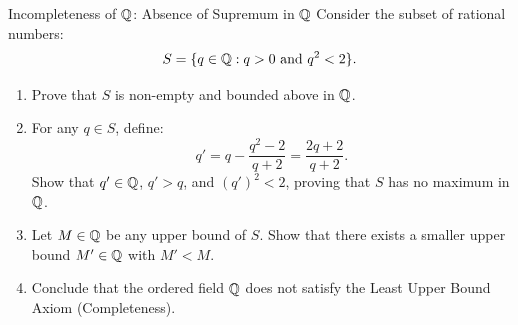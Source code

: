 \begin{exercise}{Incompleteness of $\mathbb{Q}$: Absence of Supremum in $\mathbb{Q}$}
Consider the subset of rational numbers:
\[
S = \{q \in \mathbb{Q} : q > 0 \text{ and } q^2 < 2\}.
\]
\begin{enumerate}[leftmargin=1.5em,itemsep=2pt]
  \item Prove that $S$ is non-empty and bounded above in $\mathbb{Q}$.
  \item For any $q \in S$, define:
  \[
  q' = q - \frac{q^2 - 2}{q + 2} = \frac{2q + 2}{q + 2}.
  \]
  Show that $q' \in \mathbb{Q}$, $q' > q$, and $(q')^2 < 2$, proving that $S$ has no maximum in $\mathbb{Q}$.
  \item Let $M \in \mathbb{Q}$ be any upper bound of $S$. Show that there exists a smaller upper bound $M' \in \mathbb{Q}$ with $M' < M$.
  \item Conclude that the ordered field $\mathbb{Q}$ does not satisfy the Least Upper Bound Axiom (Completeness).
\end{enumerate}
\end{exercise}

\begin{tabletworkspace}[5.5cm]
\end{tabletworkspace}


